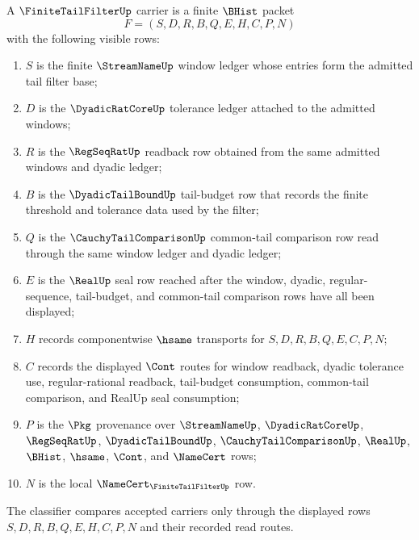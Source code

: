 \begin{definition}
\label{def:finite-tail-filter-carrier}
A $\FiniteTailFilterUp$ carrier is a finite $\BHist$ packet
$$
F=(S,D,R,B,Q,E,H,C,P,N)
$$
with the following visible rows:
\begin{enumerate}
\item $S$ is the finite $\StreamNameUp$ window ledger whose entries form the admitted tail filter base;
\item $D$ is the $\DyadicRatCoreUp$ tolerance ledger attached to the admitted windows;
\item $R$ is the $\RegSeqRatUp$ readback row obtained from the same admitted windows and dyadic ledger;
\item $B$ is the $\DyadicTailBoundUp$ tail-budget row that records the finite threshold and tolerance data used by the filter;
\item $Q$ is the $\CauchyTailComparisonUp$ common-tail comparison row read through the same window ledger and dyadic ledger;
\item $E$ is the $\RealUp$ seal row reached after the window, dyadic, regular-sequence, tail-budget, and common-tail comparison rows have all been displayed;
\item $H$ records componentwise $\hsame$ transports for $S,D,R,B,Q,E,C,P,N$;
\item $C$ records the displayed $\Cont$ routes for window readback, dyadic tolerance use, regular-rational readback, tail-budget consumption, common-tail comparison, and RealUp seal consumption;
\item $P$ is the $\Pkg$ provenance over $\StreamNameUp$, $\DyadicRatCoreUp$, $\RegSeqRatUp$, $\DyadicTailBoundUp$, $\CauchyTailComparisonUp$, $\RealUp$, $\BHist$, $\hsame$, $\Cont$, and $\NameCert$ rows;
\item $N$ is the local $\NameCert_{\FiniteTailFilterUp}$ row.
\end{enumerate}
The classifier compares accepted carriers only through the displayed rows $S,D,R,B,Q,E,H,C,P,N$ and their recorded read routes.
\end{definition}


